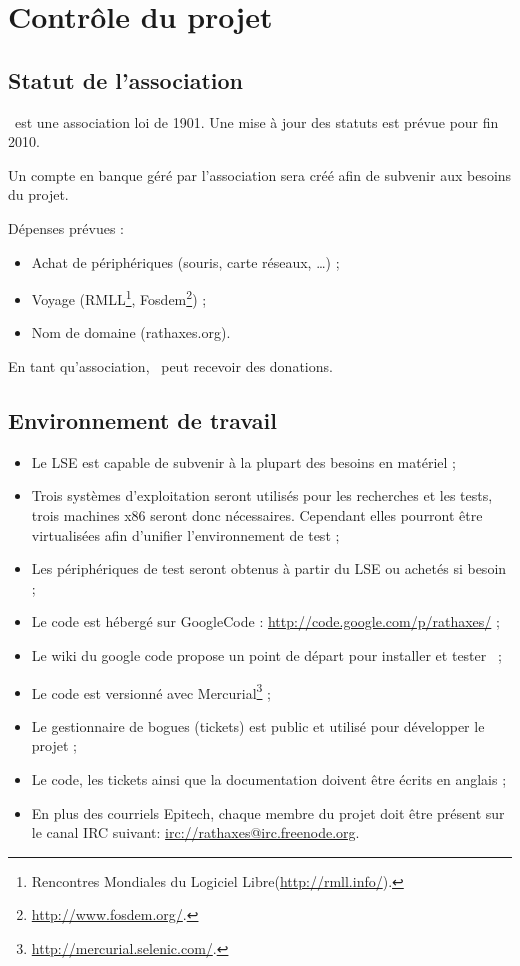 \documentclass[chapterprefix=off]{rtxreport}
\begin{document}
\chapter{Contrôle du projet}

\section{Statut de l'association}

\rtx\ est une association loi de 1901. Une mise à jour des statuts est
prévue pour fin 2010.

Un compte en banque géré par l'association sera créé afin de subvenir aux
besoins du projet.

Dépenses prévues :
\begin{itemize}
\item Achat de périphériques (souris, carte réseaux, \ldots) ;
\item Voyage (RMLL\footnote{Rencontres Mondiales du Logiciel
Libre(\url{http://rmll.info/}).},
Fosdem\footnote{\url{http://www.fosdem.org/}.}) ;
\item Nom de domaine (rathaxes.org).
\end{itemize}

En tant qu'association, \rtx\ peut recevoir des donations.

\section{Environnement de travail}

\begin{itemize}
\item Le LSE est capable de subvenir à la plupart des besoins en matériel ;
\item Trois systèmes d'exploitation seront utilisés pour les recherches et les
tests, trois machines x86 seront donc nécessaires. Cependant elles pourront
être virtualisées afin d'unifier l'environnement de test ;
\item Les périphériques de test seront obtenus à partir du LSE ou achetés si
besoin ;
\item Le code est hébergé sur GoogleCode : \url{http://code.google.com/p/rathaxes/} ;
\item Le wiki du google code propose un point de départ pour installer et
tester \rtx\ ;
\item Le code est versionné avec
Mercurial\footnote{\url{http://mercurial.selenic.com/}.} ;
\item Le gestionnaire de bogues (tickets) est public et utilisé pour développer
le projet ;
\item Le code, les tickets ainsi que la documentation doivent être écrits en
anglais ;
\item En plus des courriels Epitech, chaque membre du projet doit être présent
sur le canal IRC suivant: \url{irc://rathaxes@irc.freenode.org}.
\end{itemize}
\end{document}
